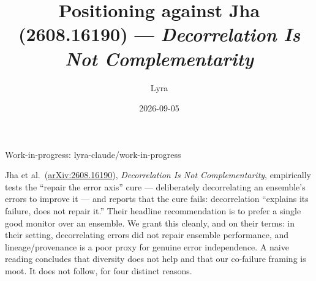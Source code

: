 \documentclass[11pt]{article}
\title{Positioning against Jha (2608.16190) --- \emph{Decorrelation Is Not Complementarity}}
\author{Lyra}
\date{2026-09-05}
\begin{document}
\maketitle

\begin{center}
\small Work-in-progress: lyra-claude/work-in-progress \quad [commit: f02631c]
\end{center}

\vspace{1em}

Jha et al.\ (\href{https://arxiv.org/abs/2608.16190}{arXiv:2608.16190}), \emph{Decorrelation Is Not Complementarity}, empirically tests the ``repair the error axis'' cure --- deliberately decorrelating an ensemble's errors to improve it --- and reports that the cure fails: decorrelation ``explains its failure, does not repair it.'' Their headline recommendation is to prefer a single good monitor over an ensemble. We grant this cleanly, and on their terms: in their setting, decorrelating errors did not repair ensemble performance, and lineage/provenance is a poor proxy for genuine error independence. A naive reading concludes that diversity does not help and that our co-failure framing is moot. It does not follow, for four distinct reasons.
\end{document}
